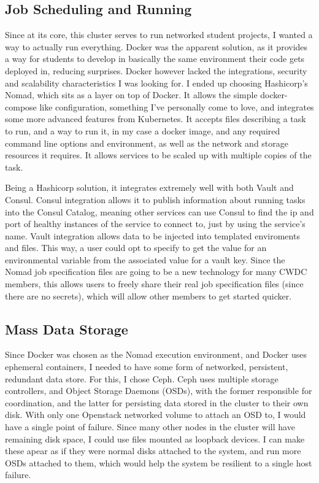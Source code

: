 \documentclass{article}
\begin{document}
\subsection{Job Scheduling and Running}
Since at its core, this cluster serves to run networked student projects, I wanted a way to actually run everything. Docker was the apparent solution, as it provides a way for students to develop in basically the same environment their code gets deployed in, reducing surprises. Docker however lacked the integrations, security and scalability characteristics I was looking for. I ended up choosing Hashicorp's Nomad, which sits as a layer on top of Docker. It allows the simple docker-compose like configuration, something I've personally come to love, and integrates some more advanced features from Kubernetes. It accepts files describing a task to run, and a way to run it, in my case a docker image, and any required command line options and environment, as well as the network and storage resources it requires. It allows services to be scaled up with multiple copies of the task.

Being a Hashicorp solution, it integrates extremely well with both Vault and Consul. Consul integration allows it to publish information about running tasks into the Consul Catalog, meaning other services can use Consul to find the ip and port of healthy instances of the service to connect to, just by using the service's name. Vault integration allows data to be injected into templated enviroments and files. This way, a user could opt to specify to get the value for an environmental variable from the associated value for a vault key. Since the Nomad job specification files are going to be a new technology for many CWDC members, this allows users to freely share their real job specification files (since there are no secrets), which will allow other members to get started quicker.

\subsection{Mass Data Storage}
Since Docker was chosen as the Nomad execution environment, and Docker uses ephemeral containers, I needed to have some form of networked, persistent, redundant data store. For this, I chose Ceph. Ceph uses multiple storage controllers, and Object Storage Daemons (OSDs), with the former responsible for coordination, and the latter for persisting data stored in the cluster to their own disk. With only one Openstack networked volume to attach an OSD to, I would have a single point of failure. Since many other nodes in the cluster will have remaining disk space, I could use files mounted as loopback devices. I can make these apear as if they were normal disks attached to the system, and run more OSDs attached to them, which would help the system be resilient to a single host failure. 
\end{document}
